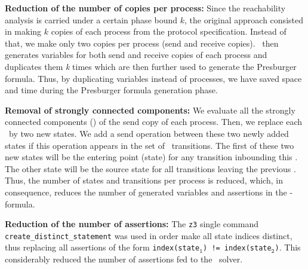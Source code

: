 \begin{description}
\item{\textbf{Reduction of the number of copies per process:}}
Since the reachability analysis is carried under a certain phase bound $k$, the original approach consisted in making $k$ copies of each process from the protocol specification.
Instead of that, we make only two copies per process (send and receive copies).
\MPass\ then generates variables for both send and receive copies of each process and duplicates them \emph{k} times which are then further used to generate the Presburger formula.
%
Thus, by duplicating variables instead of processes, we have saved space and time during the Presburger formula generation phase.
%
\item{\textbf{Removal of strongly connected components:}}
We evaluate all the strongly connected components (\Scc) of the send copy of each process. 
Then, we replace each \Scc\ by two new states.
We add a send operation between these two newly added states if this operation appears in the set of \Scc\ transitions.
The first of these two new states will be the entering point (state) for any transition inbounding this \Scc.
The other state will be  the source state for all transitions leaving the previous \Scc.
%
Thus, the number of states and transitions per process is reduced, which, in consequence, reduces the number of generated variables and assertions in the \Smt-formula.
\item{\textbf{Reduction of the number of assertions:}} The \texttt{z3} single command \texttt{create\_distinct\_statement} was used in order make all state indices distinct,
thus replacing all assertions of the form \texttt{index(state$_{\texttt{1}}$) != index(state$_{\texttt{2}}$)}.
This considerably reduced the number of assertions fed to the \Smt\ solver.
\end{description}
